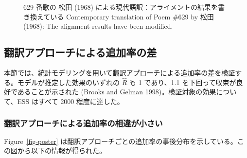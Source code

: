 \documentclass[
  letterpaper,
  DIV=11,
  numbers=noendperiod]{scrartcl}
\begin{document}
\begin{figure}


\caption{\label{fig-mtd-629}629 番歌の 松田 (1968)
による現代語訳：アライメントの結果を書き換えている Contemporary
translation of Poem \#629 by 松田 (1968): The alignment results have
been modified.}

\end{figure}%

\subsection{翻訳アプローチによる追加率の差}\label{ux7ffbux8a33ux30a2ux30d7ux30edux30fcux30c1ux306bux3088ux308bux8ffdux52a0ux7387ux306eux5dee}

本節では、統計モデリングを用いて翻訳アプローチによる追加率の差を検証する。モデルが推定した効果のいずれの
\(\hat{R}\) も 1 であり、1.1 を下回って収束が良好であることが示された
(Brooks and Gelman 1998)。検証対象の効果について、ESS はすべて 2000
程度に達した。

\subsubsection*{翻訳アプローチによる追加率の相違が小さい}\label{ux7ffbux8a33ux30a2ux30d7ux30edux30fcux30c1ux306bux3088ux308bux8ffdux52a0ux7387ux306eux76f8ux9055ux304cux5c0fux3055ux3044}

Figure~\ref{fig-poster}
は翻訳アプローチごとの追加率の事後分布を示している。この図から以下の情報が得られた。
\end{document}
